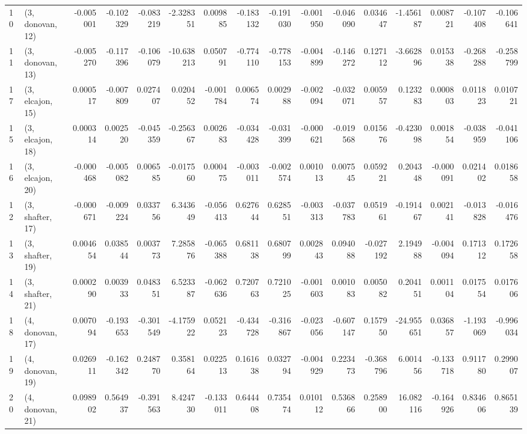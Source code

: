 \begin{tabular}{llrrrrrrrrrrrrrr}
10 &  (3, donovan, 12) &  -0.005001 & -0.102329 & -0.083219 &  -2.328351 &  0.009885 &  -0.183132 & -0.191030 & -0.001950 & -0.046090 &  0.034647 &  -1.456187 &  0.008721 & -0.107408 & -0.106641 \\
11 &  (3, donovan, 13) &  -0.005270 & -0.117396 & -0.106079 & -10.638213 &  0.050791 &  -0.774110 & -0.778153 & -0.004899 & -0.146272 &  0.127112 &  -3.662896 &  0.015338 & -0.268288 & -0.258799 \\
17 &  (3, elcajon, 15) &   0.000517 & -0.007809 &  0.027407 &   0.020452 & -0.001784 &   0.006574 &  0.002988 & -0.002094 & -0.032071 &  0.005957 &   0.123283 &  0.000803 &  0.011823 &  0.010721 \\
15 &  (3, elcajon, 18) &   0.000314 &  0.002520 & -0.045359 &  -0.256367 &  0.002683 &  -0.034428 & -0.031399 & -0.000621 & -0.019568 &  0.015676 &  -0.423098 &  0.001854 & -0.038959 & -0.041106 \\
16 &  (3, elcajon, 20) &  -0.000468 & -0.005082 &  0.006585 &  -0.017560 &  0.000475 &  -0.003011 & -0.002574 &  0.001013 &  0.007545 &  0.059221 &   0.204348 & -0.000091 &  0.021402 &  0.018658 \\
12 &  (3, shafter, 17) &  -0.000671 & -0.009224 &  0.033756 &   6.343649 & -0.056413 &   0.627644 &  0.628551 & -0.003313 & -0.037783 &  0.051961 &  -0.191467 &  0.002141 & -0.013828 & -0.016476 \\
13 &  (3, shafter, 19) &   0.004654 &  0.038544 &  0.003773 &   7.285876 & -0.065388 &   0.681138 &  0.680799 &  0.002843 &  0.094088 & -0.027192 &   2.194988 & -0.004094 &  0.171312 &  0.172658 \\
14 &  (3, shafter, 21) &   0.000290 &  0.003933 &  0.048351 &   6.523387 & -0.062636 &   0.720763 &  0.721025 & -0.001603 &  0.001083 &  0.005082 &   0.204151 &  0.001104 &  0.017554 &  0.017606 \\
18 &  (4, donovan, 17) &   0.007094 & -0.193653 & -0.301549 &  -4.175922 &  0.052123 &  -0.434728 & -0.316867 & -0.023056 & -0.607147 &  0.157950 & -24.955651 &  0.036857 & -1.193069 & -0.996034 \\
19 &  (4, donovan, 19) &   0.026911 & -0.162342 &  0.248770 &   0.358164 &  0.022513 &   0.161638 &  0.032794 & -0.004929 &  0.223473 & -0.368796 &   6.001456 & -0.133718 &  0.911780 &  0.299007 \\
20 &  (4, donovan, 21) &   0.098902 &  0.564937 & -0.391563 &   8.424730 & -0.133011 &   0.644408 &  0.735474 &  0.010112 &  0.536866 &  0.258900 &  16.082116 & -0.164926 &  0.834606 &  0.865139 \\

\end{tabular}
